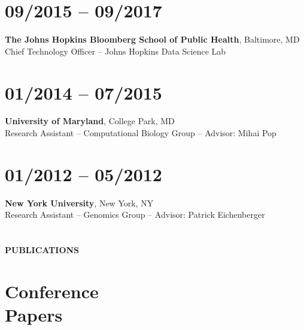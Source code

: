 \section{09/2015 -- 09/2017}
\textbf{The Johns Hopkins Bloomberg School of Public Health}, Baltimore, MD \\
Chief Technology Officer -- Johns Hopkins Data Science Lab

\section{01/2014 -- 07/2015}
\textbf{University of Maryland}, College Park, MD \\
Research Assistant --  Computational Biology Group -- Advisor: Mihai Pop

\section{01/2012 -- 05/2012}
\textbf{New York University}, New York, NY \\
Research Assistant --  Genomics Group -- Advisor: Patrick Eichenberger

%
%
%

\newpage

\section{} \vspace{0.2in} \textbf{PUBLICATIONS} \vspace{-0.05in}


\section{Conference \\ Papers}

